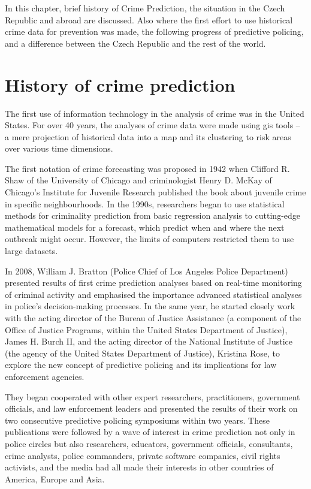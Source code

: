 \documentclass[thesis=M,english]{FITthesis}[2012/10/20]
\begin{document}
In this chapter, brief history of Crime Prediction, the situation in the Czech Republic and abroad are discussed. Also where the first effort to use historical crime data for prevention was made, the following progress of predictive policing, and a difference between the Czech Republic and the rest of the world. 

\section{History of crime prediction}

The first use of information technology in the analysis of crime was in the United States. For over 40 years, the analyses of crime data were made using \gls{gis} tools -- a mere projection of historical data into a map and its clustering to risk areas over various time dimensions.\cite[5]{PP13}

The first notation of crime forecasting was proposed in 1942 when Clifford R. Shaw of the University of Chicago and criminologist Henry D. McKay of Chicago's Institute for Juvenile Research published the book about juvenile crime in specific neighbourhoods. In the 1990s, researchers began to use statistical methods for criminality prediction from basic regression analysis to cutting-edge mathematical models for a forecast, which predict when and where the next outbreak might occur. However, the limits of computers restricted them to use large datasets.\cite{Hvistendahl2016crime}

In 2008, William J. Bratton (Police Chief of Los Angeles Police Department) presented results of first crime prediction analyses based on real-time monitoring of criminal activity and emphasised the importance advanced statistical analyses in police's decision-making processes. In the same year, he started closely work with the acting director of the Bureau of Justice Assistance (a component of the Office of Justice Programs, within the United States Department of Justice), James H. Burch II, and the acting director of the National Institute of Justice (the agency of the United States Department of Justice), Kristina Rose, to explore the new concept of predictive policing and its implications for law enforcement agencies.\cite[4]{PP13}

They began cooperated with other expert researchers, practitioners, government officials, and law enforcement leaders and presented the results of their work on two consecutive predictive policing symposiums within two years. These publications were followed by a wave of interest in crime prediction not only in police circles but also researchers, educators, government officials, consultants, crime analysts, police commanders, private software companies, civil rights activists, and the media had all made their interests in other countries of America, Europe and Asia.\cite[4--5]{PP13}
\end{document}
